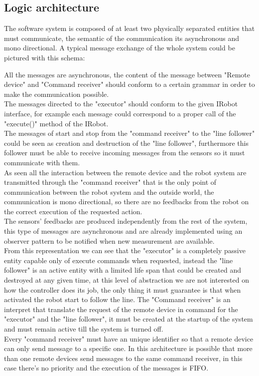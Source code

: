\documentclass{llncs}
\begin{document}
\subsection{Logic architecture}
The software system is composed of at least two physically separated entities that must communicate, the semantic of the communication its asynchronous and mono directional. A typical message exchange of the whole system could be pictured with this schema:
\begin{center}
\end{center}
All the messages are asynchronous, the content of the message between "Remote device" and "Command receiver" should conform to a certain grammar in order to make the communication possible.\\
The messages directed to the "executor" should conform to the given IRobot interface, for example each message could correspond to a proper call of the "execute()" method of the IRobot.\\
The messages of start and stop from the "command receiver" to the "line follower" could be seen as creation and destruction of the "line follower", furthermore this follower must be able to receive incoming messages from the sensors so it must communicate with them.\\
As seen all the interaction between the remote device and the robot system are transmitted through the "command receiver" that is the only point of communication between the robot system and the outside world, the communication is mono directional, so there are no feedbacks from the robot on the correct execution of the requested action.\\
The sensors' feedbacks are produced independently from the rest of the system, this type of messages are asynchronous and are already implemented using an observer pattern to be notified when new measurement are available.\\

From this representation we can see that the "executor" is a completely passive entity capable only of execute commands when requested, instead the "line follower" is an active entity with a limited life span that could be created and destroyed at any given time, at this level of abstraction we are not interested on how the controller does its job, the only thing it must guarantee is that when activated the robot start to follow the line. The "Command receiver" is an interpret that translate the request of the remote device in command for the "executor" and the "line follower", it must be created at the startup of the system and must remain active till the system is turned off.\\
Every "command receiver" must have an unique identifier so that a remote device can only send message to a specific one. In this architecture is possible that more than one remote devices send messages to the same command receiver, in this case there's no priority and the execution of the messages is FIFO. 
\end{document}
